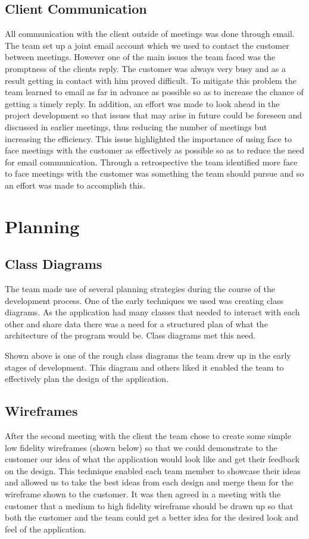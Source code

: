 \documentclass{l3proj}
\begin{document}
\subsection{Client Communication}
All communication with the client outside of meetings was done through email. The team set up a joint email account which we used to contact the customer between meetings. However one of the main issues the team faced was the promptness of the clients reply. The customer was always very busy and as a result getting in contact with him proved difficult. To mitigate this problem the team learned to email as far in advance as possible so as to increase the chance of getting a timely reply. In addition, an effort was made to look ahead in the project development so that issues that may arise in future could be foreseen and discussed in earlier meetings, thus reducing the number of meetings but increasing the efficiency. This issue highlighted the importance of using face to face meetings with the customer as effectively as possible so as to reduce the need for email communication. Through a retrospective the team identified more face to face meetings with the customer was something the team should pursue and so an effort was made to accomplish this.
\section{Planning}
\label{sec:planning}

\subsection{Class Diagrams}
The team made use of several planning strategies during the course of the development process. One of the early techniques we used was creating class diagrams. As the application had many classes that needed to interact with each other and share data there was a need for a structured plan of what the architecture of the program would be. Class diagrams met this need.

Shown above is one of the rough class diagrams the team drew up in the early stages of development. This diagram and others liked it enabled the team to effectively plan the design of the application.

\subsection{Wireframes}
After the second meeting with the client the team chose to create some simple low fidelity wireframes (shown below) so that we could demonstrate to the customer our idea of what the application would look like and get their feedback on the design. This technique enabled each team member to showcase their ideas and allowed us to take the best ideas from each design and merge them for the wireframe shown to the customer. It was then agreed in a meeting with the customer that a medium to high fidelity wireframe should be drawn up so that both the customer and the team could get a better idea for the desired look and feel of the application.
\end{document}
